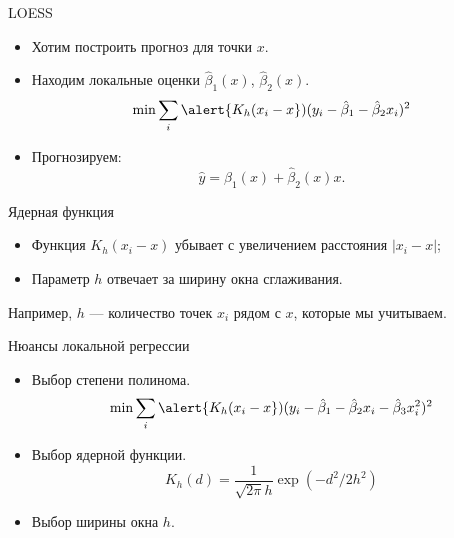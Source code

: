\begin{frame}{LOESS}

\begin{itemize}
  \item Хотим построить прогноз для точки $x$.
  \item Находим \alert{локальные оценки} $\hat\beta_1(x)$, $\hat\beta_2(x)$. 
  \[
      \min \sum_i \alert{K_h(x_i - x}) (y_i - \hat\beta_1 - \hat\beta_2 x_i)^2
  \]
  \item Прогнозируем:
  \[
  \hat y = \hat\beta_1(x) + \hat\beta_2(x) x.  
  \] 
\end{itemize}

\pause
\alert{Ядерная функция}
\begin{itemize}
  \item Функция $K_h(x_i - x)$ убывает с увеличением расстояния $|x_i - x|$;
  \item Параметр $h$ отвечает за ширину окна сглаживания. 
\end{itemize}

\pause
Например, $h$ — количество точек $x_i$ рядом с $x$, которые мы учитываем.

\end{frame}

\begin{frame}{Нюансы локальной регрессии}

  \begin{itemize}
    \item Выбор \alert{степени полинома}.
    \[
      \min \sum_i \alert{K_h(x_i - x}) (y_i - \hat\beta_1 - \hat\beta_2 x_i - \hat\beta_3 x_i^2)^2
    \]  
    \item Выбор \alert{ядерной} функции.
    \[
      K_h(d) = \frac{1}{\sqrt{2\pi}h} \exp(- d^2/2h^2)
    \]
    \item Выбор \alert{ширины окна} $h$.

\end{itemize}

\end{frame}

